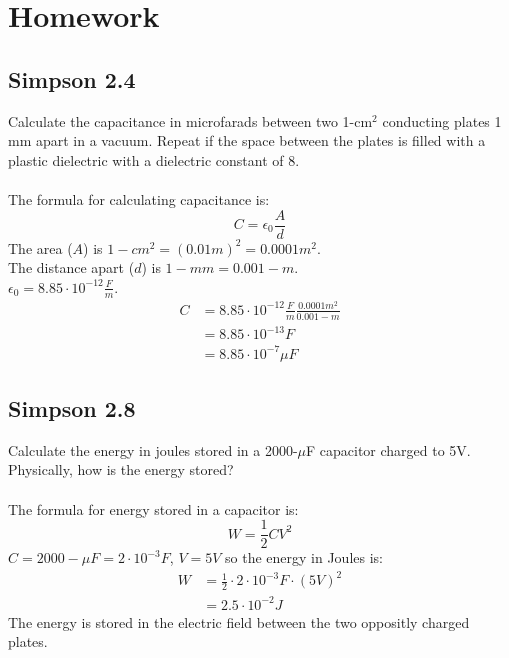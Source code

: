 \documentclass[a4paper,12pt]{article}
\newcommand{\F}[2]{\ensuremath{\frac{#1}{#2}}}
\begin{document}
\section*{Homework}
\subsection*{Simpson 2.4}
Calculate the capacitance in microfarads between two 1-cm$^2$ conducting plates 1 mm apart in a vacuum.  Repeat if the space between the plates is filled with a plastic dielectric with a dielectric constant of 8.
\\
\\
The formula for calculating capacitance is:
\[C=\epsilon_0\F{A}{d}\]
The area ($A$) is $1-cm^2=(0.01m)^2=0.0001m^2$.\\
The distance apart ($d$) is $ 1-mm=0.001-m$.\\
$\epsilon_0=8.85\cdot10^{-12}\F{F}{m}$.
\begin{align*}
C&=8.85\cdot10^{-12}\F{F}{m}\F{0.0001m^2}{0.001-m}\\
&=8.85\cdot10^{-13}F\\
&=8.85\cdot10^{-7}\mu F
\end{align*}
\subsection*{Simpson 2.8}
Calculate the energy in joules stored in a 2000-$\mu$F capacitor charged to 5V. Physically, how is the energy stored?
\\
\\
The formula for energy stored in a capacitor is:
\[W=\F{1}{2}CV^2\]
$C=2000-\mu F=2\cdot10^{-3}F$, $V=5V$ so the energy in Joules is:
\begin{align*}
W&=\F{1}{2}\cdot2\cdot10^{-3}F\cdot(5V)^2\\
&=2.5\cdot10^{-2}J
\end{align*}
The energy is stored in the electric field between the two oppositly charged plates.
\end{document}
